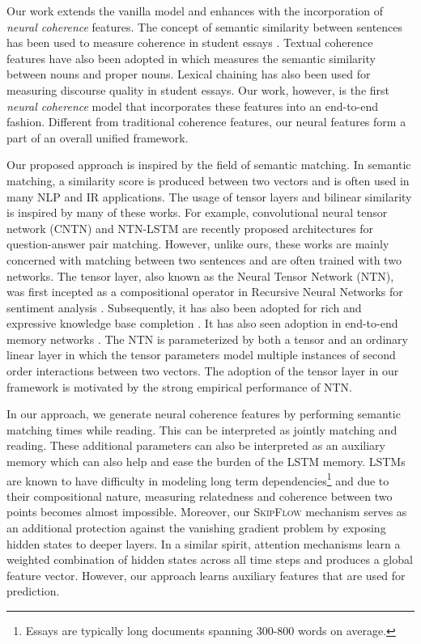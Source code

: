 \documentclass[letterpaper]{article}
\begin{document}
Our work extends the vanilla model and enhances with the incorporation of \textit{neural coherence} features. The concept of semantic similarity between sentences has been used to measure coherence in student essays \cite{higgins2007sentence,higgins2004evaluating}. Textual coherence features have also been adopted in \cite{DBLP:conf/emnlp/ChenH13} which measures the semantic similarity between nouns and proper nouns. Lexical chaining \cite{somasundaran2014lexical} has also been used for measuring discourse quality in student essays. Our work, however, is the first \textit{neural coherence} model that incorporates these features into an end-to-end fashion. Different from traditional coherence features, our neural features form a part of an overall unified framework.

Our proposed approach is inspired by the field of semantic matching. In semantic matching, a similarity score is produced between two vectors and is often used in many NLP and IR applications. The usage of tensor layers and bilinear similarity is inspired by many of these works. For example, convolutional neural tensor network (CNTN) \cite{DBLP:conf/ijcai/QiuH15} and NTN-LSTM \cite{DBLP:conf/sigir/TayPLH17} are recently proposed architectures for question-answer pair matching. However, unlike ours, these works are mainly concerned with matching between two sentences and are often trained with two networks. The tensor layer, also known as the Neural Tensor Network (NTN), was first incepted as a compositional operator in Recursive Neural Networks for sentiment analysis \cite{socher2013recursive}. Subsequently, it has also been adopted for rich and expressive knowledge base completion \cite{DBLP:conf/nips/SocherCMN13}. It has also seen adoption in end-to-end memory networks \cite{DBLP:conf/cikm/TayTH17}. The NTN is parameterized by both a tensor and an ordinary linear layer in which the tensor parameters model multiple instances of second order interactions between two vectors. The adoption of the tensor layer in our framework is motivated by the strong empirical performance of NTN.


In our approach, we generate neural coherence features by performing semantic matching  times while reading. This can be interpreted as jointly matching and reading. These additional parameters can also be interpreted as an auxiliary memory which can also help and ease the burden of the LSTM memory. LSTMs are known to have difficulty in modeling long term dependencies\footnote{Essays are typically long documents spanning 300-800 words on average.} and due to their compositional nature, measuring relatedness and coherence between two points becomes almost impossible. Moreover, our \textsc{SkipFlow} mechanism serves as an additional protection against the vanishing gradient problem by exposing hidden states to deeper layers. In a similar spirit, attention mechanisms \cite{bahdanau2014neural} learn a weighted combination of hidden states across all time steps and produces a global feature vector. However, our approach learns auxiliary features that are used for prediction. 
\end{document}
